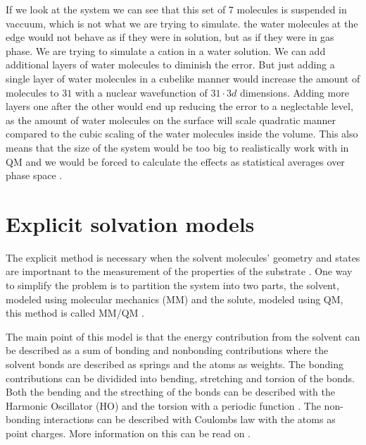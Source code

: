 \documentclass[../master_thesis.tex]{subfiles}
\begin{document}
If we look at the system we can see that this set of 7 molecules is suspended in
vaccuum, which is not what we are trying to simulate. the water molecules at
the edge would not behave as if they were in solution, but as if they were in
gas phase. We are trying to simulate a  cation in a water solution.
We can add additional layers of water molecules to diminish the error. But
just adding a single layer of water molecules in a cubelike manner would
increase the amount of molecules to $31$ with a nuclear wavefunction of
$31\cdot3d$ dimensions. Adding more layers one after the other would end up
reducing the error to a neglectable level, as the amount of water molecules on
the surface will scale quadratic manner compared to the cubic scaling of the
water molecules inside the volume. This also means that the size of the system
would be too big to realistically work with in \ac{QM} and we would be forced to
calculate the effects as statistical averages over phase space
\cite{Cramer:2004}.

\section{Explicit solvation models}

The explicit method is necessary when the solvent molecules' geometry and states
are importnant to the measurement of the properties of the substrate
\cite{Cramer:2004}.
One way to simplify the problem is to partition the system into two parts, the
solvent, modeled using molecular mechanics (MM) and the solute, modeled using
\ac{QM}, this method is called MM/QM \cite{Mennucci:2018}.

The main point of this model is that the energy contribution from the solvent
can be described as a sum of bonding and nonbonding contributions
\cite{Cramer:2004} where the solvent bonds are described as springs
\cite{Mennucci:2018} and the atoms as weights. The bonding contributions can be
dividided into bending, stretching and torsion of the bonds. Both the bending
and the strecthing of the bonds can be described with the Harmonic Oscillator
(HO) and the torsion with a periodic function \cite{Mennucci:2018}. The
non-bonding interactions can be described with Coulombs law with the atoms as
point charges. More information on this can be read on \cite{Cramer:2004,
Jensen:2017}.
\end{document}
